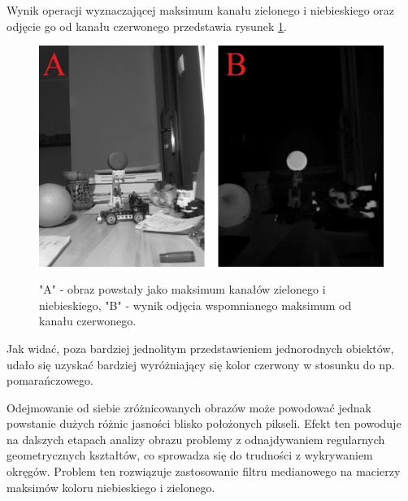 Wynik operacji wyznaczającej maksimum kanału zielonego i niebieskiego oraz odjęcie go od kanału czerwonego przedstawia rysunek \ref{red-max}.\newpage
\begin{figure}[H]
\begin{center}
\includegraphics[scale=0.42]{imgs/imgMax+RwoBG.jpg}
\caption[Kanał czerwony minus maksimum zielonego i niebieskiego.]\small{"A" - obraz powstały jako maksimum kanałów zielonego i niebieskiego, "B" - wynik odjęcia wspomnianego maksimum od kanału czerwonego.}
\label{red-max}
\end{center}
\end{figure}
Jak widać, poza bardziej jednolitym przedstawieniem jednorodnych obiektów, udało się uzyskać bardziej wyróżniający się kolor czerwony w stosunku do np. pomarańczowego.

Odejmowanie od siebie zróżnicowanych obrazów może powodować jednak powstanie dużych różnic jasności blisko położonych pikseli.  Efekt ten powoduje na dalszych etapach analizy obrazu problemy z odnajdywaniem regularnych geometrycznych kształtów, co sprowadza się do trudności z wykrywaniem okręgów. Problem ten rozwiązuje zastosowanie filtru medianowego na macierzy maksimów koloru niebieskiego i zielonego.


